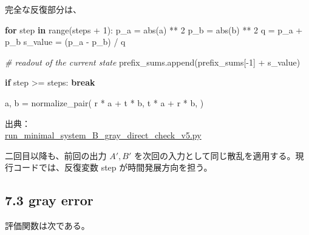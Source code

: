 \documentclass[
  10pt,
  a4paper,
]{article}
\newenvironment{Shaded}{}{}
\newcommand{\BuiltInTok}[1]{\textcolor[rgb]{0.00,0.50,0.00}{#1}}
\newcommand{\CommentTok}[1]{\textcolor[rgb]{0.38,0.63,0.69}{\textit{#1}}}
\newcommand{\ControlFlowTok}[1]{\textcolor[rgb]{0.00,0.44,0.13}{\textbf{#1}}}
\newcommand{\DecValTok}[1]{\textcolor[rgb]{0.25,0.63,0.44}{#1}}
\newcommand{\KeywordTok}[1]{\textcolor[rgb]{0.00,0.44,0.13}{\textbf{#1}}}
\newcommand{\NormalTok}[1]{#1}
\newcommand{\OperatorTok}[1]{\textcolor[rgb]{0.40,0.40,0.40}{#1}}
\begin{document}
完全な反復部分は、

\begin{Shaded}
\begin{Highlighting}[]
\ControlFlowTok{for}\NormalTok{ step }\KeywordTok{in} \BuiltInTok{range}\NormalTok{(steps }\OperatorTok{+} \DecValTok{1}\NormalTok{):}
\NormalTok{    p\_a }\OperatorTok{=} \BuiltInTok{abs}\NormalTok{(a) }\OperatorTok{**} \DecValTok{2}
\NormalTok{    p\_b }\OperatorTok{=} \BuiltInTok{abs}\NormalTok{(b) }\OperatorTok{**} \DecValTok{2}
\NormalTok{    q }\OperatorTok{=}\NormalTok{ p\_a }\OperatorTok{+}\NormalTok{ p\_b}
\NormalTok{    s\_value }\OperatorTok{=}\NormalTok{ (p\_a }\OperatorTok{{-}}\NormalTok{ p\_b) }\OperatorTok{/}\NormalTok{ q}

    \CommentTok{\# readout of the current state}
\NormalTok{    prefix\_sums.append(prefix\_sums[}\OperatorTok{{-}}\DecValTok{1}\NormalTok{] }\OperatorTok{+}\NormalTok{ s\_value)}

    \ControlFlowTok{if}\NormalTok{ step }\OperatorTok{\textgreater{}=}\NormalTok{ steps:}
        \ControlFlowTok{break}

\NormalTok{    a, b }\OperatorTok{=}\NormalTok{ normalize\_pair(}
\NormalTok{        r }\OperatorTok{*}\NormalTok{ a }\OperatorTok{+}\NormalTok{ t }\OperatorTok{*}\NormalTok{ b,}
\NormalTok{        t }\OperatorTok{*}\NormalTok{ a }\OperatorTok{+}\NormalTok{ r }\OperatorTok{*}\NormalTok{ b,}
\NormalTok{    )}
\end{Highlighting}
\end{Shaded}

出典：\\
\href{../20260715/run_minimal_system_B_gray_direct_check_v5.py\#L81-L136}{run\_minimal\_system\_B\_gray\_direct\_check\_v5.py}

二回目以降も、前回の出力 \(A',B'\)
を次回の入力として同じ散乱を適用する。現行コードでは、反復変数 step
が時間発展方向を担う。

\subsection{7.3 gray error}\label{gray-error}

評価関数は次である。
\end{document}
